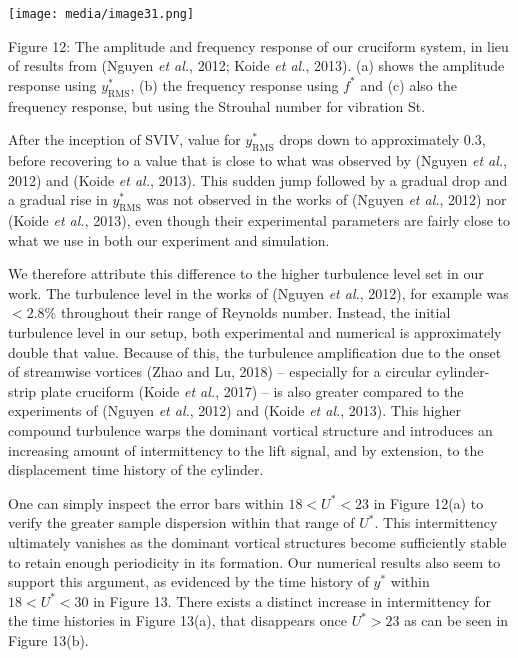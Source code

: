 \documentclass[]{article}
\begin{document}
\texttt{[image: media/image31.png]}

\protect\hypertarget{_Ref41040609}{}{\protect\hypertarget{_Toc41048835}{}{}}Figure
12: The amplitude and frequency response of our cruciform system, in
lieu of results from (Nguyen \emph{et al.}, 2012; Koide \emph{et al.},
2013). (a) shows the amplitude response using \(y_{\text{RMS}}^{*}\),
(b) the frequency response using \(f^{*}\) and (c) also the frequency
response, but using the Strouhal number for vibration St.

After the inception of SVIV, value for \(y_{\text{RMS}}^{*}\) drops down
to approximately 0.3, before recovering to a value that is close to what
was observed by (Nguyen \emph{et al.}, 2012) and (Koide \emph{et al.},
2013). This sudden jump followed by a gradual drop and a gradual rise in
\(y_{\text{RMS}}^{*}\) was not observed in the works of (Nguyen \emph{et
al.}, 2012) nor (Koide \emph{et al.}, 2013), even though their
experimental parameters are fairly close to what we use in both our
experiment and simulation.

We therefore attribute this difference to the higher turbulence level
set in our work. The turbulence level in the works of (Nguyen \emph{et
al.}, 2012), for example was \(< 2.8\%\) throughout their range of
Reynolds number. Instead, the initial turbulence level in our setup,
both experimental and numerical is approximately double that value.
Because of this, the turbulence amplification due to the onset of
streamwise vortices (Zhao and Lu, 2018) -- especially for a circular
cylinder-strip plate cruciform (Koide \emph{et al.}, 2017) -- is also
greater compared to the experiments of (Nguyen \emph{et al.}, 2012) and
(Koide \emph{et al.}, 2013). This higher compound turbulence warps the
dominant vortical structure and introduces an increasing amount of
intermittency to the lift signal, and by extension, to the displacement
time history of the cylinder.

One can simply inspect the error bars within \(18 < U^{*} < 23\) in
Figure 12(a) to verify the greater sample dispersion within that range
of \(U^{*}\). This intermittency ultimately vanishes as the dominant
vortical structures become sufficiently stable to retain enough
periodicity in its formation. Our numerical results also seem to support
this argument, as evidenced by the time history of \(y^{*}\) within
\({18 < U}^{*} < 30\) in Figure 13. There exists a distinct increase in
intermittency for the time histories in Figure 13(a), that disappears
once \(U^{*} > 23\) as can be seen in Figure 13(b).
\end{document}
